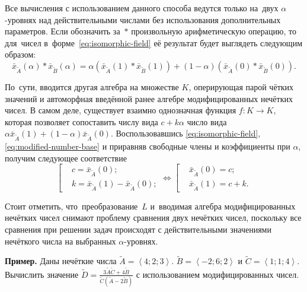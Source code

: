 Все вычисления с использованием данного способа ведутся только на~двух $\alpha $-уровнях над действительными числами без использования дополнительных параметров. Если обозначить за~$*$ произвольную арифметическую операцию, то для~чисел в~форме~\eqref{eq:isomorphic-field} её результат будет выглядеть следующим образом:
\begin{equation*}
  \bar{x}_{\tilde A}\left( \alpha \right)*\bar{x}_{\tilde B}\left(\alpha \right)=\alpha \left(\bar{x}_{\tilde A}\left( 1 \right)*\bar{x}_{\tilde B}\left(1 \right) \right)+\left(1-\alpha \right)\left(\bar{x}_{\tilde A}\left(0 \right)*\bar{x}_{\tilde B}\left(0 \right) \right).
\end{equation*}

По~сути, вводится другая алгебра на множестве $K$, оперирующая парой чётких значений и автоморфная введённой ранее алгебре модифицированных нечётких чисел. В самом деле, существует взаимно однозначная функция $f:K\to K$, которая позволяет сопоставить числу вида $c+k\alpha $ число вида $\alpha {{\bar{x}}_{\tilde A}}\left( 1 \right)+\left( 1-\alpha  \right){{\bar{x}}_{\tilde A}}\left( 0 \right)$. Воспользовавшись \eqref{eq:isomorphic-field}, \eqref{eq:modified-number-base} и приравняв свободные члены и коэффициенты при $\alpha$, получим следующее соответствие
\begin{equation*}
  \left[ \begin{aligned}
    & c=\bar{x}_{\tilde A}\left( 0 \right); \\ 
    & k=\bar{x}_{\tilde A}\left( 1 \right)-\bar{x}_{\tilde A}\left( 0 \right);
  \end{aligned} \right.
  \Leftrightarrow 
  \left[ \begin{aligned}
    & \bar{x}_{\tilde A}\left( 0 \right)=c; \\ 
    & \bar{x}_{\tilde A}\left( 1 \right)=c+k.
  \end{aligned} \right.
\end{equation*}

Стоит отметить, что~преобразование~$L$ и~вводимая алгебра модифицированных нечётких чисел снимают проблему сравнения двух нечётких чисел, поскольку все сравнения при решении задач происходят с действительными значениями нечёткого числа на выбранных $\alpha$-уровнях.

\textbf{Пример.} Даны нечёткие числа $\tilde{A}=\left\langle 4;2;3 \right\rangle $. $\tilde{B}=\left\langle -2;6;2 \right\rangle $ и $\tilde{C}=\left\langle 1;1;4 \right\rangle $. Вычислить значение $\displaystyle \tilde{D}=\frac{3\tilde{A}\tilde{C}+4\tilde{B}}{\tilde{C}\left( \tilde{A}-2\tilde{B} \right)}$ с использованием модифицированных чисел.

